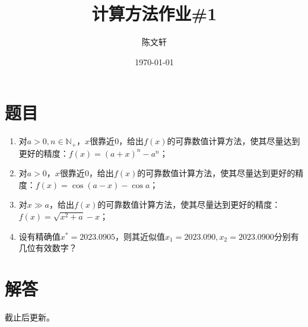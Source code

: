 \documentclass[cn,hazy,green,11pt,normal]{elegantnote}
\title{计算方法作业\#1}
\author{陈文轩}
\institute{KFRC}
\date{\today}
\begin{document}
\maketitle


\section{题目}

    \begin{enumerate}
        \item 对$a>0,n\in\mathbb{N_+}$，$x$很靠近$0$，给出$f(x)$的可靠数值计算方法，使其尽量达到更好的精度：$f(x)=(a+x)^n-a^n$；
        \item 对$a>0$，$x$很靠近$0$，给出$f(x)$的可靠数值计算方法，使其尽量达到更好的精度：$f(x)=\cos(a-x)-\cos a$；
        \item 对$x\gg a$，给出$f(x)$的可靠数值计算方法，使其尽量达到更好的精度：$f(x)=\sqrt{x^2+a}-x$；
        \item 设有精确值$x^{*}=2023.0905$，则其近似值$x_1=2023.090,x_2=2023.0900$分别有几位有效数字？
    \end{enumerate}

\section{解答}
    截止后更新。
\end{document}
